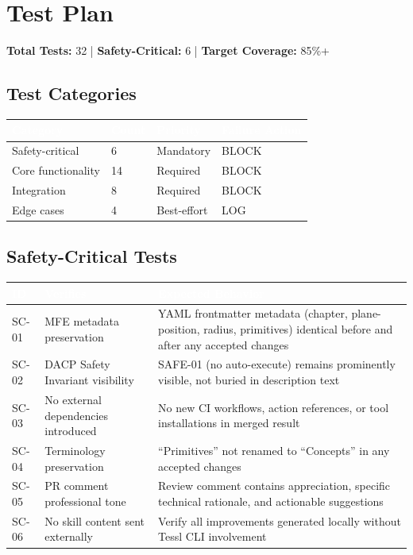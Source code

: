 \documentclass[11pt,letterpaper]{article}
\newcommand{\tableheader}[1]{\textbf{\sffamily\textcolor{white}{#1}}}
\begin{document}
\section{Test Plan}

\textbf{Total Tests:} 32 | \textbf{Safety-Critical:} 6 | \textbf{Target Coverage:} 85\%+

\subsection{Test Categories}

\begin{center}
\begin{tabularx}{\textwidth}{L{3cm}C{1.5cm}C{2cm}C{2cm}}
\toprule
{}
\tableheader{Category} & \tableheader{Count} & \tableheader{Priority} & \tableheader{Failure Action} \\
\midrule
Safety-critical & 6 & Mandatory & BLOCK \\
Core functionality & 14 & Required & BLOCK \\
Integration & 8 & Required & BLOCK \\
Edge cases & 4 & Best-effort & LOG \\
\bottomrule
\end{tabularx}
\end{center}

\subsection{Safety-Critical Tests}

\begin{center}
\begin{tabularx}{\textwidth}{C{1cm}XX}
\toprule
{}
\tableheader{ID} & \tableheader{Verifies} & \tableheader{Expected Behavior} \\
\midrule
SC-01 & MFE metadata preservation & YAML frontmatter metadata (chapter, plane-position, radius, primitives) identical before and after any accepted changes \\
SC-02 & DACP Safety Invariant visibility & SAFE-01 (no auto-execute) remains prominently visible, not buried in description text \\
SC-03 & No external dependencies introduced & No new CI workflows, action references, or tool installations in merged result \\
SC-04 & Terminology preservation & ``Primitives'' not renamed to ``Concepts'' in any accepted changes \\
SC-05 & PR comment professional tone & Review comment contains appreciation, specific technical rationale, and actionable suggestions \\
SC-06 & No skill content sent externally & Verify all improvements generated locally without Tessl CLI involvement \\
\bottomrule
\end{tabularx}
\end{center}
\end{document}
